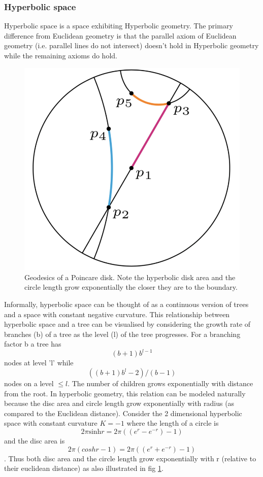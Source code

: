 \subsubsection{Hyperbolic space}
Hyperbolic space is a space exhibiting Hyperbolic geometry. The primary difference from Euclidean geometry is that the parallel axiom of Euclidean geometry (i.e. parallel lines do not intersect) doesn't hold in Hyperbolic geometry while the remaining axioms do hold.
\begin{figure}
    \centering
    \includegraphics[width=.4\textwidth]{chapter_14/files/poincare1.png}
    \caption{Geodesics of a Poincare disk. Note the hyperbolic disk area and the circle length grow exponentially the closer they are to the boundary. }
    \label{hyperb-tree}
\end{figure}
Informally, hyperbolic space can be thought of as a continuous version of trees and a space with constant negative curvature. This relationship between hyperbolic space and a tree can be visualised by considering the growth rate of branches (b) of a tree as the level (l) of the tree progresses. For a branching factor b a tree has $$(b+1)b^{l-1}$$ nodes at level 'l' while $$((b+1)b^l-2)/(b-1)$$ nodes on a level $\leq l$. The number of children grows exponentially with distance from the root. In hyperbolic geometry, this relation can be modeled naturally because the disc area and circle length grow exponentially with radius (as compared to the Euclidean distance). Consider the 2 dimensional hyperbolic space with constant curvature $K=-1$ where the length of a circle is $$2 \pi \text{sinh} r = 2 \pi ((e^r - e^{-r})-1)$$ and the disc area is $$2 \pi (cosh r -1) =2 \pi ((e^r + e^{-r})-1)$$. Thus both disc area and the circle length grow exponentially with r (relative to their euclidean distance) as also illustrated in fig \ref{hyperb-tree}.

